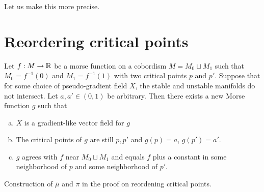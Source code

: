     Let us make this more precise.


    \section{Reordering critical points}

    \begin{theorem}
        Let $f: M \to  \mathbb{R}$ be a morse function on a cobordism $M = M_0 \sqcup M_1$ such that $ M_0 = f^{-1}(0)$ and $ M_1 = f^{-1}(1)$ with two critical points $p$ and  $p'$.
        Suppose that for some choice of pseudo-gradient field $X$, the stable and unstable manifolds do not intersect.
        Let $a, a' \in (0,1)$ be arbitrary.
        Then there exists a new Morse function $g$ such that
        \begin{enumerate}[(a)]
            \item $X$ is a gradient-like vector field for  $g$
            \item The critical points of  $g$ are still $p, p'$ and $g(p) = a$,  $g(p') = a'$.
            \item $g$ agrees with  $f$ near $M_0 \sqcup M_1$ and equals $f$ plus a constant in some neighborhood of  $p$ and some neighborhood of  $p'$.
        \end{enumerate}
    \end{theorem}
    \begin{marginfigure}
        \centering
        \caption{
            Construction of $\overline{\mu}$ and $\pi$ in the proof on reordening critical points.
        }
        \label{fig:reordening-theorem-milnor-h-cobordism}
    \end{marginfigure}
